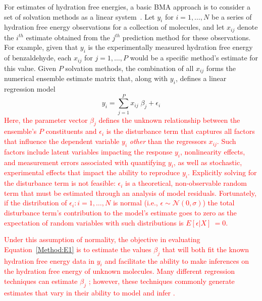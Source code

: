 \documentclass[journal=jpcbfk, manuscript=article]{achemso}
\newcommand{\+}[1]{\ensuremath{\mathbf{#1}}}
\newcommand{\rev}[1]{\textsf{\textcolor{red}{#1}}}
\begin{document}
For estimates of hydration free energies, a basic BMA approach is to consider a set of solvation methods as a linear system~\cite{Hoeting:1999,Raftery:1998,Raftery:1995}.  
Let $y_i$ for $i = 1, \ldots, N$ be a series of hydration free energy observations for a collection of molecules, and let $x_{i j}$ denote the $i^{th}$ estimate obtained from the $j^{th}$ prediction method for these observations. 
For example, given that $y_i$ is the experimentally measured hydration free energy of benzaldehyde, each $x_{i j}$ for $j = 1, \ldots, P$ would be a specific method's estimate for this value.  
Given $P$ solvation methods, the combination of all $x_{ij}$ forms the numerical ensemble estimate matrix that, along with $y_i$, defines a linear regression model 
\begin{equation}
	\label{Method:E1}
	y_i = \sum_{j=1}^P x_{ij} \;\beta_j + \epsilon_i
\end{equation}
\rev{Here, the parameter vector $\beta_j$ defines the unknown relationship between the ensemble's $P$ constituents and $\epsilon_i$ is the disturbance term that captures all factors that influence the dependent variable $y_i$ \emph{other} than the regressors $x_{ij}$.
Such factors include latent variables impacting the response $y_i$, nonlinearity effects, and measurement errors associated with quantifying $y_i$, as well as stochastic, experimental effects that impact the ability to reproduce $y_i$.  
Explicitly solving for the disturbance term is not feasible: $\epsilon_i$ is a theoretical, non-observable random term that must be estimated through an analysis of model residuals.  
Fortunately, if the distribution of $\epsilon_i: i=1,\ldots,N$ is normal (i.e., $\epsilon \sim \mathcal{N}(0,\sigma)$) the total disturbance term's contribution to the model's estimate goes to zero as the expectation of random variables with such distributions is $E [\epsilon | X]\ = 0$.}

\rev{Under this assumption of normality, the objective in evaluating Equation~\ref{Method:E1} is to estimate the values $\beta_j$ that will both fit the known hydration free energy data in $y_i$ and facilitate the ability to make inferences on the hydration free energy of unknown molecules.  
Many different regression techniques can estimate $\beta_j$ \cite{Hosmer:1989,Reiss:2012,Mallows:1973,Candes:2007}; however, these techniques commonly generate estimates that vary in their ability to model and infer \cite{Genell:2010,Hoeting:1999,Davidson:2006,Raftery:1995,Raftery:1998}.}
\end{document}
